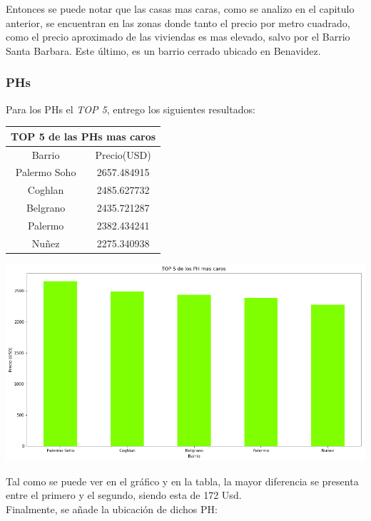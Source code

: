 \documentclass[a4paper, 10pt]{article}
\begin{document}
				Entonces se puede notar que las casas mas caras, como se analizo en el capitulo anterior, se encuentran en las zonas donde tanto el precio por metro cuadrado, como el precio aproximado de las viviendas es mas elevado, salvo por el Barrio Santa Barbara. Este último, es un barrio cerrado ubicado en Benavidez. 


				\subsubsection{PHs}
				Para los PHs el \emph{TOP 5}, entrego los siguientes resultados:
				
					\begin{center}
						\begin{tabular}{ |c|c| }
							\hline
							\multicolumn{2}{|c|}{TOP 5 de las PHs mas caros}\\
							\hline
							\hline
							Barrio & Precio(USD)\\
							\hline
							Palermo Soho & 2657.484915 \\
							Coghlan & 2485.627732 \\
							Belgrano & 2435.721287 \\
							Palermo & 2382.434241 \\
							Nuñez & 2275.340938 \\
							\hline
						\end{tabular}
					\end{center}
				
				\begin{center}
   		    				\includegraphics[width=\textwidth]{images/topPHc}
				\end{center}
				
				Tal como se puede ver en el gráfico y en la tabla, la mayor diferencia se presenta entre el primero y el segundo, siendo esta de 172 Usd.\\				
				Finalmente, se añade la ubicación de dichos PH:
				
\end{document}
